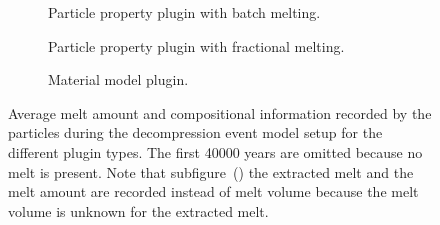 \begin{figure}
    \centering
    \begin{subfigure}{0.49\textwidth}
        \centering
        
        \caption{Particle property plugin with batch melting.}
        \label{fig:decompression_event_particle_plugin_batch}
    \end{subfigure}
    \hfill
    \begin{subfigure}{0.49\textwidth}
        \centering
        
        \caption{
            Particle property plugin with fractional melting.
        }
        \label{fig:decompression_event_particle_plugin_frac}
    \end{subfigure}
    \begin{subfigure}{0.49\textwidth}
        \centering
        
        \caption{Material model plugin.}
        \label{fig:decompression_event_material_model}
    \end{subfigure}
    \caption{
        Average melt amount and compositional information recorded by the particles during the decompression event model setup for the different plugin types.
        The first \num{40000} years are omitted because no melt is present.
        Note that subfigure~() the extracted melt and the melt amount are recorded instead of melt volume because the melt volume is unknown for the extracted melt.
    }
    \label{fig:decompression_event}
\end{figure}

